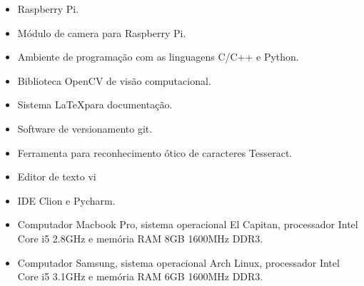 
\begin{itemize}
	\item Raspberry Pi.
	\item Módulo de camera para Raspberry Pi.
	\item Ambiente de programação com as linguagens C/C++ e Python.
	\item Biblioteca OpenCV de visão computacional.
	\item Sistema \LaTeX para documentação.
	\item Software de versionamento git.
	\item Ferramenta para reconhecimento ótico de caracteres Tesseract.
	\item Editor de texto vi
	\item IDE Clion e Pycharm.
	\item Computador Macbook Pro, sistema operacional El Capitan, processador Intel Core i5 2.8GHz e memória RAM 8GB 1600MHz DDR3.
	\item Computador Samsung, sistema operacional Arch Linux, processador Intel Core i5 3.1GHz e memória RAM 6GB 1600MHz DDR3.
\end{itemize}

